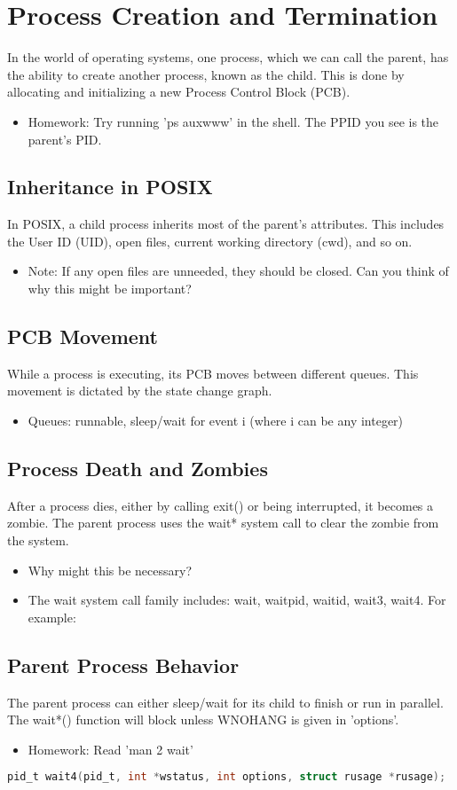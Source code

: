 \documentclass[12pt]{report}
\begin{document}
\section{Process Creation and Termination}In the world of operating systems, one process, which we can call the parent, has the ability to create another process, known as the child. This is done by allocating and initializing a new Process Control Block (PCB). \begin{itemize}\item Homework: Try running 'ps auxwww' in the shell. The PPID you see is the parent's PID.\end{itemize}\subsection{Inheritance in POSIX}In POSIX, a child process inherits most of the parent's attributes. This includes the User ID (UID), open files, current working directory (cwd), and so on. \begin{itemize}\item Note: If any open files are unneeded, they should be closed. Can you think of why this might be important?\end{itemize}\subsection{PCB Movement}While a process is executing, its PCB moves between different queues. This movement is dictated by the state change graph. \begin{itemize}\item Queues: runnable, sleep/wait for event i (where i can be any integer)\end{itemize}\subsection{Process Death and Zombies}After a process dies, either by calling exit() or being interrupted, it becomes a zombie. The parent process uses the wait* system call to clear the zombie from the system. \begin{itemize}\item Why might this be necessary?\item The wait system call family includes: wait, waitpid, waitid, wait3, wait4. For example:\end{itemize}\subsection{Parent Process Behavior}The parent process can either sleep/wait for its child to finish or run in parallel. The wait*() function will block unless WNOHANG is given in 'options'. \begin{itemize}\item Homework: Read 'man 2 wait'\end{itemize}
\begin{lstlisting}[language=C]pid_t wait4(pid_t, int *wstatus, int options, struct rusage *rusage);\end{lstlisting}
\end{document}
